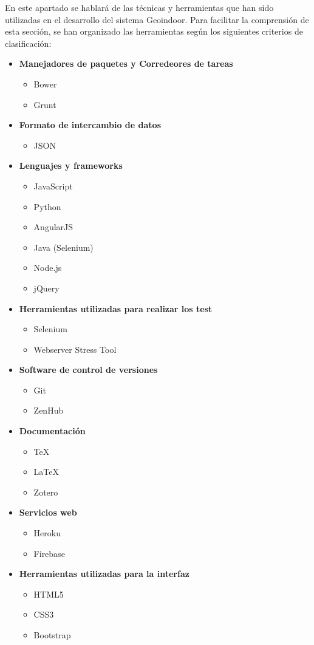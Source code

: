 
En este apartado se hablará de las técnicas y herramientas que han sido utilizadas en el desarrollo del sistema Geoindoor. Para facilitar la comprensión de esta sección, se han organizado las herramientas según los siguientes criterios de clasificación:

\begin{itemize}
	\item \textbf{Manejadores de paquetes y Corredeores de tareas}
		\begin{itemize}
			\item Bower
			\item Grunt
		\end{itemize}
	\item \textbf{Formato de intercambio de datos}
		\begin{itemize}
			\item JSON
		\end{itemize}
	\item \textbf{Lenguajes y frameworks}
		\begin{itemize}
			\item JavaScript
			\item Python
			\item AngularJS
			\item Java (Selenium)
			\item Node.js
			\item jQuery
		\end{itemize}
	\item \textbf{Herramientas utilizadas para realizar los test}
		\begin{itemize}
			\item Selenium
			\item Webserver Stress Tool
		\end{itemize}
	\item \textbf{Software de control de versiones}
		\begin{itemize}
			\item Git
			\item ZenHub
		\end{itemize}
	\item \textbf{Documentación}
		\begin{itemize}
			\item \TeX{}
			\item \LaTeX
			\item Zotero
		\end{itemize}
	\item \textbf{Servicios web}
		\begin{itemize}
			\item Heroku
			\item Firebase
		\end{itemize}
	\item \textbf{Herramientas utilizadas para la interfaz}
		\begin{itemize}
			\item HTML5
			\item CSS3
			\item Bootstrap
		\end{itemize}
\end{itemize}

